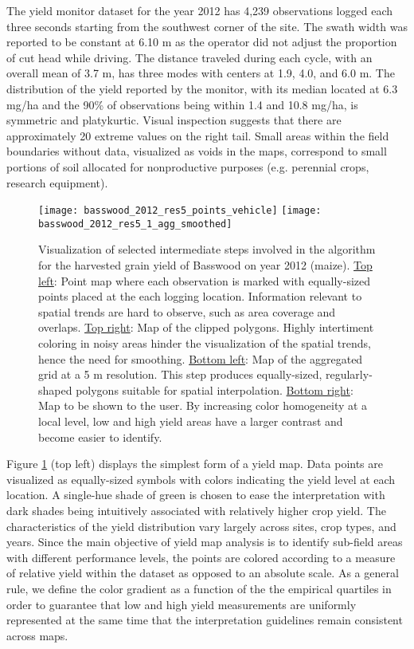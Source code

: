  The yield monitor dataset for the year 2012
has 4,239 observations logged each three seconds starting from the
southwest corner of the site. The swath width was reported to be
constant at 6.10 m as the operator did not adjust the proportion of
cut head while driving. The distance traveled during each cycle, with
an overall mean of 3.7 m, has three modes with centers at 1.9, 4.0,
and 6.0 m. The distribution of the yield reported by the monitor, with
its median located at 6.3 mg/ha and the 90\% of observations being
within 1.4 and 10.8 mg/ha, is symmetric and platykurtic. Visual
inspection suggests that there are approximately 20 extreme values on
the right tail. Small areas within the field boundaries without data,
visualized as voids in the maps, correspond to small portions of soil
allocated for nonproductive purposes (e.g. perennial crops, research
equipment).

\begin{figure}[h!]  \centering
  \texttt{[image: basswood\_2012\_res5\_points\_vehicle]}
  \texttt{[image: basswood\_2012\_res5\_1\_agg\_smoothed]}
  \caption[Visualization of selected algorithm steps as applied to a
  specific dataset]{Visualization of selected intermediate steps involved
    in the algorithm for the harvested grain yield of Basswood on year
    2012 (maize). \underline{Top left}: Point map where each observation is
    marked with equally-sized points placed at the each logging
    location. Information relevant to spatial trends are hard to observe,
    such as area coverage and overlaps. \underline{Top right}: Map of the
    clipped polygons. Highly intertiment coloring in noisy areas hinder
    the visualization of the spatial trends, hence the need for
    smoothing. \underline{Bottom left}: Map of the aggregated grid at a 5
    m resolution. This step produces equally-sized, regularly-shaped
    polygons suitable for spatial interpolation. \underline{Bottom right}:
    Map to be shown to the user. By increasing color homogeneity at a
    local level, low and high yield areas have a larger contrast and
    become easier to identify.}
  \label{fig:basswood2012-main-steps}
\end{figure}

 Figure \ref{fig:basswood2012-main-steps}
(top left) displays the simplest form of a yield map. Data points are
visualized as equally-sized symbols with colors indicating the yield
level at each location. A single-hue shade of green is chosen to ease
the interpretation with dark shades being intuitively associated with
relatively higher crop yield. The characteristics of the yield
distribution vary largely across sites, crop types, and years. Since
the main objective of yield map analysis is to identify sub-field
areas with different performance levels, the points are colored
according to a measure of relative yield within the dataset as opposed
to an absolute scale. As a general rule, we define the color gradient
as a function of the the empirical quartiles in order to guarantee
that low and high yield measurements are uniformly represented at the
same time that the interpretation guidelines remain consistent across
maps.

